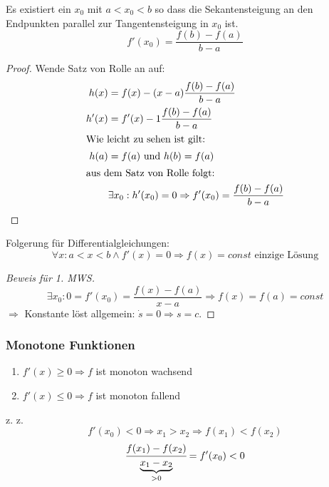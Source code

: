 Es existiert ein $x_0$ mit $a < x_0 < b$ so dass die Sekantensteigung an den Endpunkten parallel zur Tangentensteigung in $x_0$ ist.
\begin{equation*}
	f'(x_0) = \frac{f(b) - f(a)}{b - a}
\end{equation*}
\begin{proof}
	Wende Satz von Rolle an auf:
	\begin{align*}
		h(x) &= f(x) - (x - a)\frac{f(b) - f(a)}{b - a} \\
		h'(x) &= f'(x) - 1\frac{f(b) - f(a)}{b - a} \\
		\intertext{Wie leicht zu sehen ist gilt:}
		h(a) &= f(a)\text{ und }h(b) = f(a) \\
		\intertext{aus dem Satz von Rolle folgt:}
		&\exists x_0 : h'(x_0) = 0 \Rightarrow f'(x_0) = \frac{f(b) - f(a)}{b - a}
	\end{align*}
\end{proof}
Folgerung für Differentialgleichungen:
\begin{equation*}
	\forall x : a < x < b \land f'(x) = 0 \Rightarrow f(x) = const \text{ einzige Lösung}
\end{equation*}
\begin{proof}[Beweis für 1. MWS]
	\begin{equation*}
		\exists x_0 : 0 = f'(x_0) = \frac{f(x) - f(a)}{x - a} \Rightarrow f(x) = f(a) = const
	\end{equation*}
	$\Rightarrow$ Konstante löst allgemein: $\dot s = 0 \Rightarrow s = c$.
\end{proof}

\subsubsection*{Monotone Funktionen}
\begin{enumerate}
	\item $f'(x) \geq 0 \Rightarrow f$ ist monoton wachsend
	\item $f'(x) \leq 0 \Rightarrow f$ ist monoton fallend
\end{enumerate}
\begin{example}
	z. z. \[f'(x_0) < 0 \Rightarrow x_1 > x_2 \Rightarrow f(x_1) < f(x_2)\]
	\[\cfrac{f(x_1) - f(x_2)}{\underbrace{x_1 - x_2}_{> 0}} = f'(x_0) < 0\]
\end{example}

